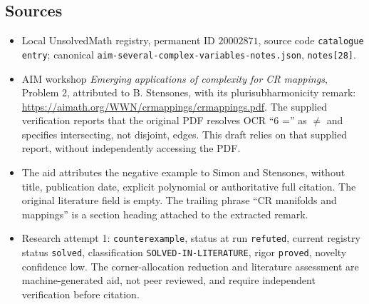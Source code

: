 \documentclass[11pt]{article}
\begin{document}
\subsection{Sources}
\begin{itemize}
\item Local UnsolvedMath registry, permanent ID $20002871$, source code \texttt{catalogue entry}; canonical \texttt{aim-several-complex-variables-notes.json}, \texttt{notes[28]}.
\item AIM workshop \emph{Emerging applications of complexity for CR mappings}, Problem 2, attributed to B. Stensones, with its plurisubharmonicity remark: \url{https://aimath.org/WWN/crmappings/crmappings.pdf}. The supplied verification reports that the original PDF resolves OCR ``6 ='' as $\ne$ and specifies intersecting, not disjoint, edges. This draft relies on that supplied report, without independently accessing the PDF.
\item The aid attributes the negative example to Simon and Stensones, without title, publication date, explicit polynomial or authoritative full citation. The original literature field is empty. The trailing phrase ``CR manifolds and mappings'' is a section heading attached to the extracted remark.
\item Research attempt 1: \texttt{counterexample}, status at run \texttt{refuted}, current registry status \texttt{solved}, classification \texttt{SOLVED-IN-LITERATURE}, rigor \texttt{proved}, novelty confidence low. The corner-allocation reduction and literature assessment are machine-generated aid, not peer reviewed, and require independent verification before citation.
\end{itemize}
\end{document}
